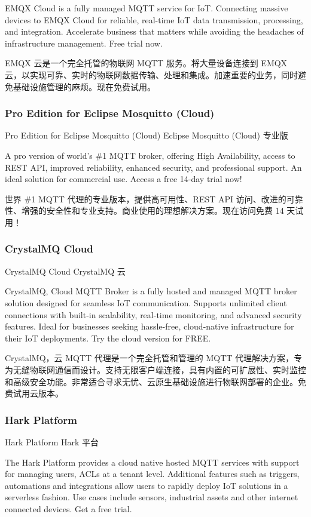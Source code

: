 \documentclass{ctexbook}
\begin{document}
EMQX Cloud is a fully managed MQTT service for IoT. Connecting massive devices to EMQX Cloud for reliable, real-time IoT data transmission, processing, and integration. Accelerate business that matters while avoiding the headaches of infrastructure management. Free trial now.

EMQX 云是一个完全托管的物联网 MQTT 服务。将大量设备连接到 EMQX 云，以实现可靠、实时的物联网数据传输、处理和集成。加速重要的业务，同时避免基础设施管理的麻烦。现在免费试用。

\subsubsection{Pro Edition for Eclipse Mosquitto (Cloud)}
Pro Edition for Eclipse Mosquitto (Cloud) Eclipse Mosquitto (Cloud) 专业版

A pro version of world's \#1 MQTT broker, offering High Availability, access to REST API, improved reliability, enhanced security, and professional support. An ideal solution for commercial use. Access a free 14-day trial now!

世界 \#1 MQTT 代理的专业版本，提供高可用性、REST API 访问、改进的可靠性、增强的安全性和专业支持。商业使用的理想解决方案。现在访问免费 14 天试用！

\subsubsection{CrystalMQ Cloud}
CrystalMQ Cloud CrystalMQ 云

CrystalMQ, Cloud MQTT Broker is a fully hosted and managed MQTT broker solution designed for seamless IoT communication. Supports unlimited client connections with built-in scalability, real-time monitoring, and advanced security features. Ideal for businesses seeking hassle-free, cloud-native infrastructure for their IoT deployments. Try the cloud version for FREE.

CrystalMQ，云 MQTT 代理是一个完全托管和管理的 MQTT 代理解决方案，专为无缝物联网通信而设计。支持无限客户端连接，具有内置的可扩展性、实时监控和高级安全功能。非常适合寻求无忧、云原生基础设施进行物联网部署的企业。免费试用云版本。

\subsubsection{Hark Platform}
Hark Platform Hark 平台

The Hark Platform provides a cloud native hosted MQTT services with support for managing users, ACLs at a tenant level. Additional features such as triggers, automations and integrations allow users to rapidly deploy IoT solutions in a serverless fashion. Use cases include sensors, industrial assets and other internet connected devices. Get a free trial.
\end{document}
